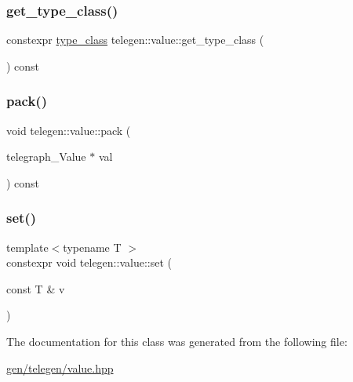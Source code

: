\mbox{\label{classtelegen_1_1value_a792839f18c1e787e369d3362f022362c}} 
\subsubsection{\texorpdfstring{get\+\_\+type\+\_\+class()}{get\_type\_class()}}
{\footnotesize\ttfamily constexpr \hyperlink{namespacetelegen_a72d4e69f0be1731e1a851a96dec858d8}{type\+\_\+class} telegen\+::value\+::get\+\_\+type\+\_\+class (\begin{DoxyParamCaption}{ }\end{DoxyParamCaption}) const\hspace{0.3cm}{\ttfamily [inline]}}

\mbox{\label{classtelegen_1_1value_a9bba0ce74da6b87a86dac99d0e5efa0c}} 
\subsubsection{\texorpdfstring{pack()}{pack()}}
{\footnotesize\ttfamily void telegen\+::value\+::pack (\begin{DoxyParamCaption}\item[{telegraph\+\_\+\+Value $\ast$}]{val }\end{DoxyParamCaption}) const\hspace{0.3cm}{\ttfamily [inline]}}

\mbox{\label{classtelegen_1_1value_a801da4870cd04e737db817d10fe6780c}} 
\subsubsection{\texorpdfstring{set()}{set()}}
{\footnotesize\ttfamily template$<$typename T $>$ \\
constexpr void telegen\+::value\+::set (\begin{DoxyParamCaption}\item[{const T \&}]{v }\end{DoxyParamCaption})\hspace{0.3cm}{\ttfamily [inline]}}



The documentation for this class was generated from the following file\+:\begin{DoxyCompactItemize}
\item 
\hyperlink{gen_2telegen_2value_8hpp}{gen/telegen/value.\+hpp}\end{DoxyCompactItemize}

